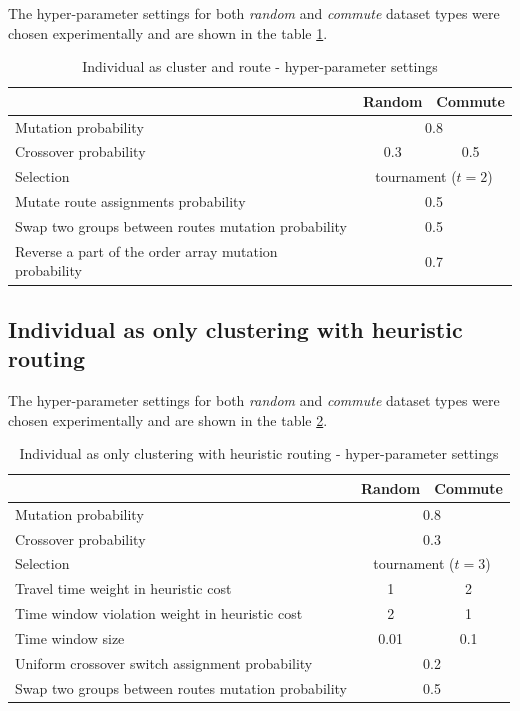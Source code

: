 The hyper-parameter settings for both \textit{random} and \textit{commute} dataset types were chosen experimentally and are shown in the table \ref{tab:evo_cr_hyperparams}.

\begin{table}[h]
    \centering
    \begin{tabular}{lcc}
         & Random & Commute \\
        \hline
        Mutation probability & \multicolumn{2}{c}{0.8} \\
        Crossover probability & 0.3 & 0.5 \\
        Selection & \multicolumn{2}{c}{tournament ($t=2$)} \\
        Mutate route assignments probability & \multicolumn{2}{c}{0.5} \\
        Swap two groups between routes mutation probability & \multicolumn{2}{c}{0.5} \\
        Reverse a part of the order array mutation probability & \multicolumn{2}{c}{0.7} \\ 
    \end{tabular}
    \caption{Individual as cluster and route - hyper-parameter settings}
    \label{tab:evo_cr_hyperparams}
\end{table}

\subsection{Individual as only clustering with heuristic routing}

The hyper-parameter settings for both \textit{random} and \textit{commute} dataset types were chosen experimentally and are shown in the table \ref{tab:evo_ch_hyperparams}.

\begin{table}[ht]
    \centering
    \begin{tabular}{lcc}
         & Random & Commute \\
        \hline
        Mutation probability & \multicolumn{2}{c}{0.8} \\
        Crossover probability & \multicolumn{2}{c}{0.3} \\
        Selection & \multicolumn{2}{c}{tournament ($t=3$)} \\
        Travel time weight in heuristic cost & 1 & 2 \\
        Time window violation weight in heuristic cost & 2 & 1 \\
        Time window size & 0.01 & 0.1 \\
        Uniform crossover switch assignment probability & \multicolumn{2}{c}{0.2} \\
        Swap two groups between routes mutation probability & \multicolumn{2}{c}{0.5} \\
    \end{tabular}
    \caption{Individual as only clustering with heuristic routing - hyper-parameter settings}
    \label{tab:evo_ch_hyperparams}
\end{table}